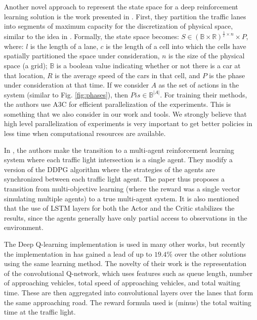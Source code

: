 \documentclass[a4paper,twoside]{article}
\begin{document}
Another novel approach to represent the state space for a deep reinforcement learning solution is the work presented in \cite{GenRaz16}. First, they partition the traffic lanes into segments of maximum capacity for the discretization of physical space, similar to the idea in \cite{WALRAVEN2016203}. Formally, the state space becomes:
$S \in(\mathbb{B} \times \mathbb{R})^{\frac{1}{c} \times n} \times P$,
where: $l$ is the length of a lane, $c$ is the length of a cell into which the cells have spatially partitioned the space under consideration, $n$ is the size of the physical space (a grid); $\mathbb{B}$ is a boolean value indicating whether or not there is a car at that location, $R$ is the average speed of the cars in that cell, and $P$ is the phase under consideration at that time. If we consider $A$ as the set of actions in the system (similar to Fig. \ref{fig:phases}), then $P is \in \mathbb{B}^{|A|}$. For training their methods, the authors use A3C \cite{MnBA} for efficient parallelization of the experiments. This is something that we also consider in our work and tools. We strongly believe that high level parallelization of experiments is very important to get better policies in less time when computational resources are available.

In \cite{Wu20}, the authors make the transition to a multi-agent reinforcement learning system where each traffic light intersection is a single agent. They modify a version of the DDPG algorithm where the strategies of the agents are synchronized between each traffic light agent. The paper thus proposes a transition from multi-objective learning (where the reward was a single vector simulating multiple agents) to a true multi-agent system. It is also mentioned that the use of LSTM layers for both the Actor and the Critic stabilizes the results, since the agents generally have only partial access to observations in the environment.

The Deep Q-learning implementation is used in many other works, but recently the implementation in \cite{ault} has gained a lead of up to $19.4\%$ over the other solutions using the same learning method. The novelty of their work is the representation of the convolutional Q-network, which uses features such as queue length, number of approaching vehicles, total speed of approaching vehicles, and total waiting time. These are then aggregated into convolutional layers over the lanes that form the same approaching road. The reward formula used is (minus) the total waiting time at the traffic light. 
\end{document}
